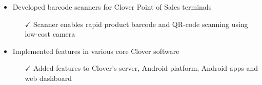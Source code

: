\begin{itemize}
   \item Developed barcode scanners for Clover Point of Sales terminals \itemsep -2pt
   \begin{itemize}
   \item[$\checkmark$]  \itemsep -8pt%
    Scanner enables rapid product barcode and QR-code scanning using low-cost camera
    \iftoggle{detailedVersion}{\begin{itemize}\item[\tiny$\blacksquare$] Combines techniques from Computer Vision, Image Processing and Algorithms
   \item[\tiny$\blacksquare$] All code written in C++, Java for Android, with prototyping in Matlab
   \item[\tiny$\blacksquare$] Used hardware parallelization, OpenCV and developed algorithms for improved image enhancement
   \end{itemize}}{}
     \end{itemize}
  \item Implemented features in various core Clover software  \itemsep -2pt
   \begin{itemize}
   \item[$\checkmark$]  \itemsep -8pt%
    Added features to Clover's server, Android platform, Android apps and web dashboard
    \iftoggle{detailedVersion}
    { \begin{itemize}
       \item[\tiny$\blacksquare$] Languages used are Java, C++, C, Javascript and SQL
      \end{itemize}
    } {}
   \end{itemize}
\end{itemize}
 
